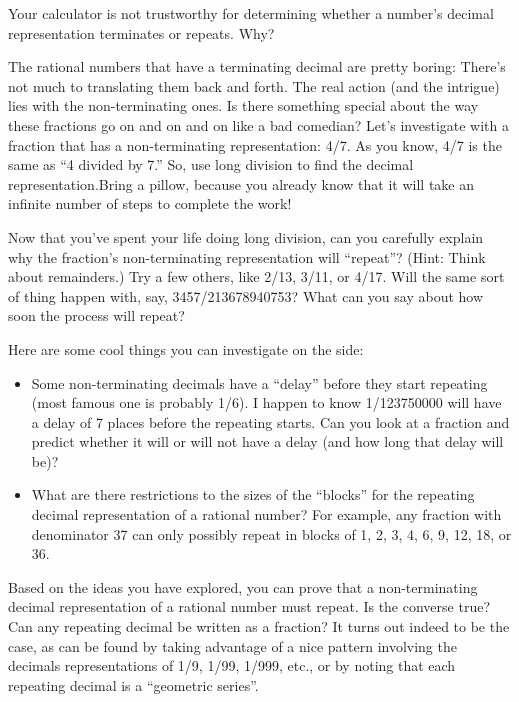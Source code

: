 \begin{question} Your calculator is not trustworthy for determining whether a number's decimal representation terminates or repeats.  Why?  
\end{question}
\QM

The rational numbers that have a terminating decimal are pretty boring:  There's not much to translating them back and forth.  The real action (and the intrigue) lies with the non-terminating ones.  Is there something special about the way these fractions go on and on and on like a bad comedian?  Let's investigate with a fraction that has a non-terminating representation:  4/7.  As you know, 4/7 is the same as ``4 divided by 7.''  So, use long division to find the decimal representation.Bring a pillow, because you already know that it will take an infinite number of steps to complete the work!

Now that you've spent your life doing long division, can you carefully explain why the fraction's non-terminating representation will ``repeat''?  (Hint:  Think about remainders.)  Try a few others, like 2/13, 3/11, or 4/17.  Will the same sort of thing happen with, say, 3457/213678940753?  What can you say about how soon the process will repeat?  

Here are some cool things you can investigate on the side:
\begin{itemize}
\item Some non-terminating decimals have a ``delay'' before they start repeating (most famous one is probably 1/6).  I happen to know 1/123750000 will have a delay of 7 places before the repeating starts.  Can you look at a fraction and predict whether it will or will not have a delay (and how long that delay will be)?   
\item What are there restrictions to the sizes of the ``blocks'' for the repeating decimal representation of a rational number?  For example, any fraction with denominator 37 can only possibly repeat in blocks of 1, 2, 3, 4, 6, 9, 12, 18, or 36.
\end{itemize}

Based on the ideas you have explored, you can prove that a non-terminating decimal representation of a rational number must repeat.  Is the converse true?  Can any repeating decimal be written as a fraction?  It turns out indeed to be the case, as can be found by taking advantage of a nice pattern involving the decimals representations of 1/9, 1/99, 1/999, etc., or by noting that each repeating decimal is a ``geometric series''.

